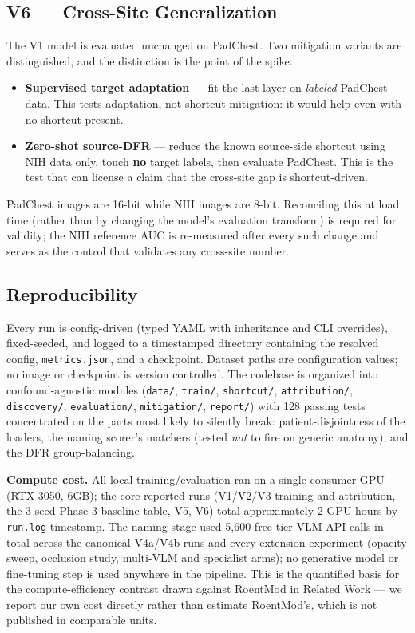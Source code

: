 \documentclass{ieeeaccess}
\begin{document}
\subsection{V6 --- Cross-Site Generalization}
The V1 model is evaluated unchanged on PadChest. Two mitigation variants are distinguished, and the distinction is the point of the spike:
\begin{itemize}
\item \textbf{Supervised target adaptation} --- fit the last layer on \emph{labeled} PadChest data. This tests adaptation, not shortcut mitigation: it would help even with no shortcut present.
\item \textbf{Zero-shot source-DFR} --- reduce the known source-side shortcut using NIH data only, touch \textbf{no} target labels, then evaluate PadChest. This is the test that can license a claim that the cross-site gap is shortcut-driven.
\end{itemize}

PadChest images are 16-bit while NIH images are 8-bit. Reconciling this at load time (rather than by changing the model's evaluation transform) is required for validity; the NIH reference AUC is re-measured after every such change and serves as the control that validates any cross-site number.

\subsection{Reproducibility}
\begin{sloppypar}
Every run is config-driven (typed YAML with inheritance and CLI overrides), fixed-seeded, and logged to a timestamped directory containing the resolved config, \texttt{metrics.json}, and a checkpoint. Dataset paths are configuration values; no image or checkpoint is version controlled. The codebase is organized into confound-agnostic modules (\texttt{data/}, \texttt{train/}, \texttt{shortcut/}, \texttt{attribution/}, \texttt{discovery/}, \texttt{evaluation/}, \texttt{mitigation/}, \texttt{report/}) with 128 passing tests concentrated on the parts most likely to silently break: patient-disjointness of the loaders, the naming scorer's matchers (tested \emph{not} to fire on generic anatomy), and the DFR group-balancing.
\end{sloppypar}

\textbf{Compute cost.} All local training/evaluation ran on a single consumer GPU (RTX 3050, 6GB); the core reported runs (V1/V2/V3 training and attribution, the 3-seed Phase-3 baseline table, V5, V6) total approximately 2 GPU-hours by \texttt{run.log} timestamp. The naming stage used 5,600 free-tier VLM API calls in total across the canonical V4a/V4b runs and every extension experiment (opacity sweep, occlusion study, multi-VLM and specialist arms); no generative model or fine-tuning step is used anywhere in the pipeline. This is the quantified basis for the compute-efficiency contrast drawn against RoentMod in Related Work --- we report our own cost directly rather than estimate RoentMod's, which is not published in comparable units.
\end{document}
